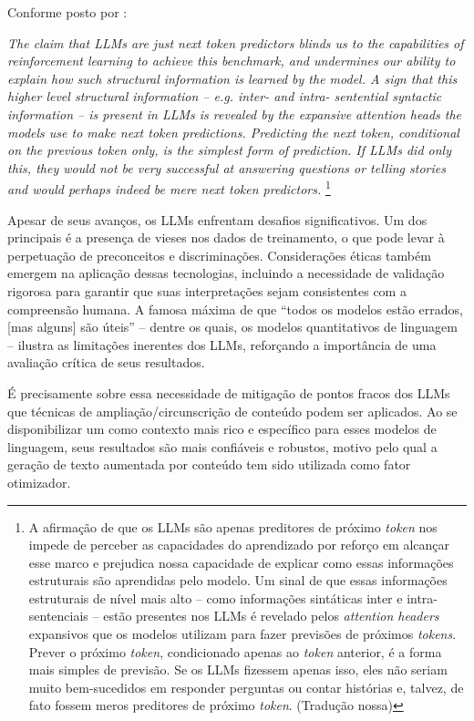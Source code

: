 Conforme posto por :
\begin{citacao}
    \textit{The claim that LLMs are just next token predictors blinds us to the capabilities of reinforcement learning to achieve this benchmark, and undermines our ability to explain how such structural information is learned by the model. A sign that this higher level structural information -- e.g. inter- and intra- sentential syntactic information -- is present in LLMs is revealed by the expansive attention heads the models use to make next token predictions. Predicting the next token, conditional on the previous token only, is the simplest form of prediction. If LLMs did only this, they would not be very successful at answering questions or telling stories and would perhaps indeed be mere next token predictors.} \footnote{A afirmação de que os LLMs são apenas preditores de próximo \textit{token} nos impede de perceber as capacidades do aprendizado por reforço em alcançar esse marco e prejudica nossa capacidade de explicar como essas informações estruturais são aprendidas pelo modelo. Um sinal de que essas informações estruturais de nível mais alto -- como informações sintáticas inter e intra-sentenciais -- estão presentes nos LLMs é revelado pelos \textit{attention headers} expansivos que os modelos utilizam para fazer previsões de próximos \textit{tokens}. Prever o próximo \textit{token}, condicionado apenas ao \textit{token} anterior, é a forma mais simples de previsão. Se os LLMs fizessem apenas isso, eles não seriam muito bem-sucedidos em responder perguntas ou contar histórias e, talvez, de fato fossem meros preditores de próximo \textit{token}. (Tradução nossa)}
\end{citacao}

Apesar de seus avanços, os \ac{LLM}s  enfrentam desafios significativos. Um dos principais é a presença de vieses nos dados de treinamento, o que pode levar à perpetuação de preconceitos e discriminações. Considerações éticas também emergem na aplicação dessas tecnologias, incluindo a necessidade de validação rigorosa para garantir que suas interpretações sejam consistentes com a compreensão humana. A famosa máxima de que ``todos os modelos estão errados, [mas alguns] são úteis'' \cite{GeorgeBox} -- dentre os quais, os modelos quantitativos de linguagem -- ilustra as limitações inerentes dos \ac{LLM}s, reforçando a importância de uma avaliação crítica de seus resultados.

É precisamente sobre essa necessidade de mitigação de pontos fracos dos \ac{LLM}s que técnicas de ampliação/circunscrição de conteúdo podem ser aplicados. Ao se disponibilizar um como contexto mais rico e específico para esses modelos de linguagem, seus resultados são mais confiáveis e robustos, motivo pelo qual a geração de texto aumentada por conteúdo tem sido utilizada como fator otimizador.

